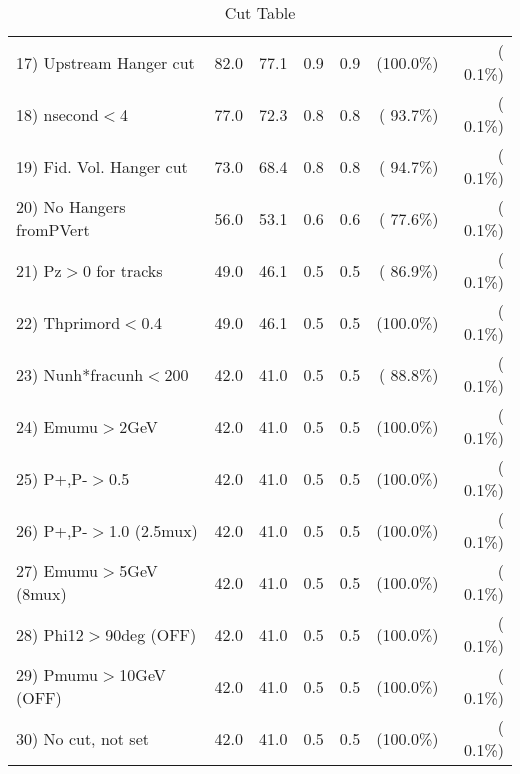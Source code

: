\begin{table}[h!]
\begin{tabular}{||l||r|r|r|r|r|r||}
 17) Upstream Hanger cut  &         82.0 &         77.1 &          0.9 &          0.9 & (100.0\%) & (  0.1\%) \\
 18) nsecond$<$4          &         77.0 &         72.3 &          0.8 &          0.8 & ( 93.7\%) & (  0.1\%) \\
 19) Fid. Vol. Hanger cut &         73.0 &         68.4 &          0.8 &          0.8 & ( 94.7\%) & (  0.1\%) \\
 20) No Hangers fromPVert &         56.0 &         53.1 &          0.6 &          0.6 & ( 77.6\%) & (  0.1\%) \\
 21) Pz$>$0 for tracks    &         49.0 &         46.1 &          0.5 &          0.5 & ( 86.9\%) & (  0.1\%) \\
 22) Thprimord$<$0.4      &         49.0 &         46.1 &          0.5 &          0.5 & (100.0\%) & (  0.1\%) \\
 23) Nunh*fracunh$<$200   &         42.0 &         41.0 &          0.5 &          0.5 & ( 88.8\%) & (  0.1\%) \\
 24) Emumu$>$2GeV         &         42.0 &         41.0 &          0.5 &          0.5 & (100.0\%) & (  0.1\%) \\
 25) P+,P-$>$0.5          &         42.0 &         41.0 &          0.5 &          0.5 & (100.0\%) & (  0.1\%) \\
 26) P+,P-$>$1.0 (2.5mux) &         42.0 &         41.0 &          0.5 &          0.5 & (100.0\%) & (  0.1\%) \\
 27) Emumu$>$5GeV  (8mux) &         42.0 &         41.0 &          0.5 &          0.5 & (100.0\%) & (  0.1\%) \\
 28) Phi12$>$90deg  (OFF) &         42.0 &         41.0 &          0.5 &          0.5 & (100.0\%) & (  0.1\%) \\
 29) Pmumu$>$10GeV  (OFF) &         42.0 &         41.0 &          0.5 &          0.5 & (100.0\%) & (  0.1\%) \\
 30) No cut, not set      &         42.0 &         41.0 &          0.5 &          0.5 & (100.0\%) & (  0.1\%) \\
 \hline
 \hline
 \end{tabular}
 \caption{Cut Table           }
 \label{tab-cutcohjpsi-mumu_anuecc}
 \end{table}
